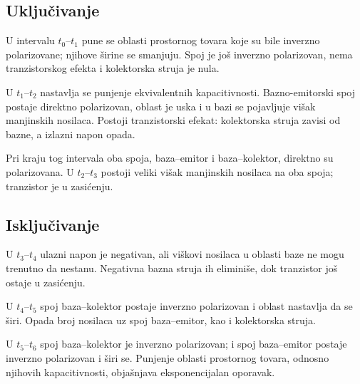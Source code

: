 \subsection*{Uključivanje}
U intervalu $t_0$–$t_1$ pune se oblasti prostornog tovara koje su bile inverzno polarizovane; njihove širine se smanjuju. Spoj je još inverzno polarizovan, nema tranzistorskog efekta i kolektorska struja je nula.

U $t_1$–$t_2$ nastavlja se punjenje ekvivalentnih kapacitivnosti. Bazno-emitorski spoj postaje direktno polarizovan, oblast je uska i u bazi se pojavljuje višak manjinskih nosilaca. Postoji tranzistorski efekat: kolektorska struja zavisi od bazne, a izlazni napon opada.

Pri kraju tog intervala oba spoja, baza–emitor i baza–kolektor, direktno su polarizovana. U $t_2$–$t_3$ postoji veliki višak manjinskih nosilaca na oba spoja; tranzistor je u zasićenju.
\subsection*{Isključivanje}
U $t_3$–$t_4$ ulazni napon je negativan, ali viškovi nosilaca u oblasti baze ne mogu trenutno da nestanu. Negativna bazna struja ih eliminiše, dok tranzistor još ostaje u zasićenju.

U $t_4$–$t_5$ spoj baza–kolektor postaje inverzno polarizovan i oblast nastavlja da se širi. Opada broj nosilaca uz spoj baza–emitor, kao i kolektorska struja.

U $t_5$–$t_6$ spoj baza–kolektor je inverzno polarizovan; i spoj baza–emitor postaje inverzno polarizovan i širi se. Punjenje oblasti prostornog tovara, odnosno njihovih kapacitivnosti, objašnjava eksponencijalan oporavak.
